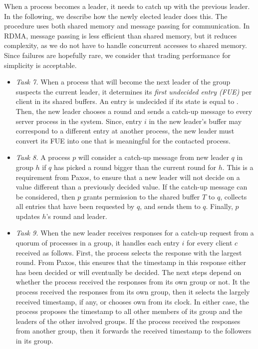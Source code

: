 %

When a process becomes a leader, it needs to catch up with the previous leader.
In the following, we describe how the newly elected leader does this.
The procedure uses both shared memory and message passing for communication.
In RDMA, message passing is less efficient than shared memory, but it reduces complexity, as we do not have to handle concurrent accesses to shared memory.
Since failures are hopefully rare, we consider that trading performance for simplicity is acceptable.

\begin{itemize}
\item \emph{Task 7.} 
When a process that will become the next leader of the group suspects the current leader, it determines its \emph{first undecided entry (FUE)} per client in its shared buffers.
An entry is undecided if its state is equal to \mcast. 
Then, the new leader chooses a round and sends a catch-up message to every server process in the system.
Since, entry $i$ in the new leader's buffer may correspond to a different entry at another process, the new leader must convert its FUE into one that is meaningful for the contacted process.

\item \emph{Task 8.} 
A process $p$ will consider a catch-up message from new leader $q$ in group $h$ if $q$ has picked a round bigger than the current round for $h$. 
This is a requirement from Paxos, to ensure that a new leader will not decide on a value different than a previously decided value.
If the catch-up message can be considered, then $p$ grants permission to the shared buffer $T$ to $q$, collects all entries that have been requested by $q$, and sends them to $q$.
Finally, $p$ updates $h$'s round and leader.

\item \emph{Task 9.}
When the new leader receives responses for a catch-up request from a quorum of processes in a group, it handles each entry $i$ for every client $c$ received as follows.
First, the process selects the response with the largest round. 
From Paxos, this ensures that the timestamp in this response either has been decided or will eventually be decided.
The next steps depend on whether the process received the responses from its own group or not.
It the process received the responses from its own group, then it selects the largely received timestamp, if any, or chooses own from its clock. In either case, the process proposes the timestamp to all other members of its group and the leaders of the other involved groups.
If the process received the responses from another group, then it forwards the received timestamp to the followers in its group.
\end{itemize}

